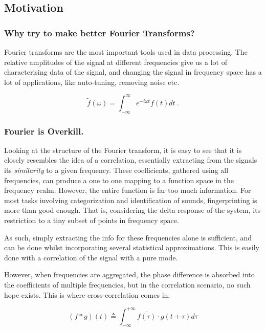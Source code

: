 \subsection{Motivation}

%

\subsubsection{Why try to make better Fourier Transforms?} Fourier transforms
are the most important tools used in data processing. The relative amplitudes of
the signal at different frequencies give us a lot of characterising data of the
signal, and changing the signal in frequency space has a lot of applications,
like auto-tuning, removing noise etc. \cite{wiki:fourier}

\begin{equation}
    \tilde{f}(\omega) = \int_{-\infty}^{\infty} e^{-i\omega t}f(t) dt~.
\end{equation}


\subsubsection{Fourier is Overkill.}
Looking at the structure of the Fourier transform, it is easy to see that it is
closely resembles the idea of a correlation, essentially extracting from the
signals its \emph{similarity} to a given frequency. These coefficients, gathered
using all frequencies, can produce a one to one mapping to a function space in
the frequency realm. However, the entire function is far too much information.
For most tasks involving categorization and identification of sounds,
fingerprinting is more than good enough. That is, considering the delta response
of the system, its restriction to a tiny subset of points in frequency space.

As such, simply extracting the info for these frequencies alone is sufficient,
and can be done whilst incorporating several statistical approximations. This is
easily done with a correlation of the signal with a pure mode. \cite{wiki:coranddep}

However, when frequencies are aggregated, the phase difference is absorbed into
the coefficients of multiple frequencies, but in the correlation scenario, no
such hope exists. This is where cross-correlation comes in. \cite{wiki:crosscor}

\begin{equation}
    (f \ast g)(t) \triangleq \int_{-\infty}^{+\infty} \overline{f(\tau)} \cdot g(t+\tau) d\tau
\end{equation}

